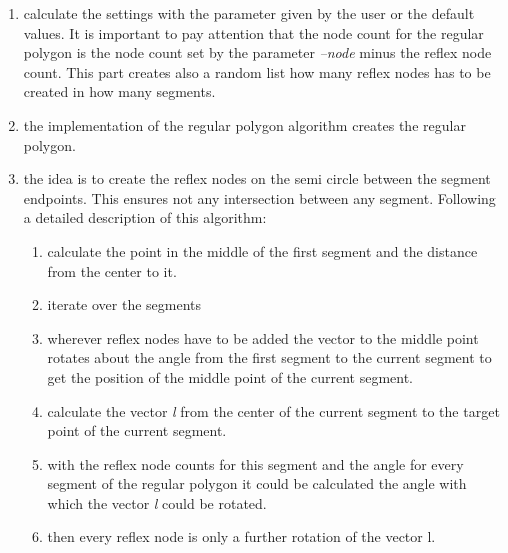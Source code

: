 \begin{enumerate}
  \item calculate the settings with the parameter given by the user or
    the default values. It is important to pay attention that the node count for
    the regular polygon is the node count set by the parameter \textit{--node}
    minus the reflex node count. This part creates also a random list how many
    reflex nodes has to be created in how many segments.
  \item the implementation of the regular polygon algorithm creates the regular
    polygon.
  \item the idea is to create the reflex nodes on the semi circle between the
    segment endpoints. This ensures not any intersection between any segment.
    Following a detailed description of this algorithm:
    \begin{enumerate}
      \item calculate the point in the middle of the first segment and
        the distance from the center to it.
      \item iterate over the segments
      \item wherever reflex nodes have to be added the vector to the
        middle point rotates about the angle from the first segment
        to the current segment to get the position of the middle point
        of the current segment.
      \item calculate the vector \textit{l} from the center of the current
        segment to the target point of the current segment.
      \item with the reflex node counts for this segment and the angle for every
        segment of the regular polygon it could be calculated the angle with
        which the vector \textit{l} could be rotated.
      \item then every reflex node is only a further rotation of the
        vector l.
    \end{enumerate}
\end{enumerate}

